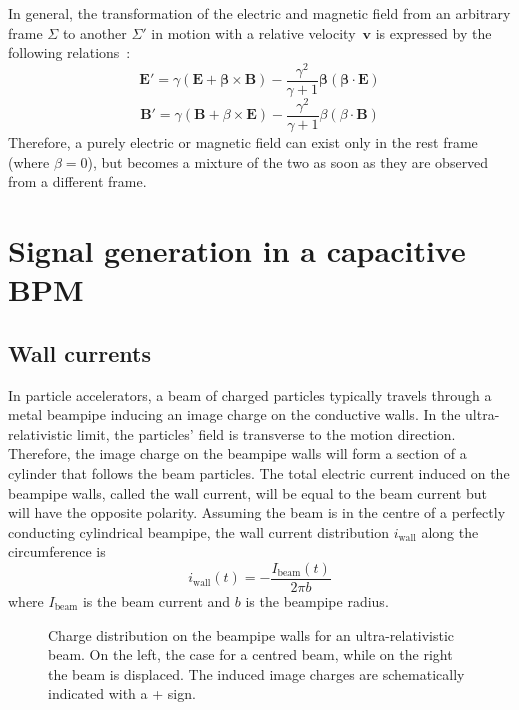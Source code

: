 In general, the transformation of the electric and magnetic field from an arbitrary frame $\Sigma$ to another $\Sigma'$ in motion with a relative velocity~$\mathbf{v}$ is expressed by the following relations~\cite{Jackson:490457}:
\begin{equation}
\mathbf{E'} = \gamma \left( \mathbf{E} + \mathbf{\beta} \times \mathbf{B} \right) -\frac{\gamma^2}{\gamma +1} \mathbf{\beta} \left( \mathbf{\beta} \cdot \mathbf{E}  \right)
\end{equation}
\begin{equation}
\mathbf{B'} = \gamma \left( \mathbf{B} + \beta \times \mathbf{E} \right) -\frac{\gamma^2}{\gamma +1} \beta \left( \beta \cdot \mathbf{B}  \right)
\end{equation}
Therefore, a purely electric or magnetic field can exist only in the rest frame (where $\beta=0$), but becomes a mixture of the two as soon as they are observed from a different frame. 






\section[Signal generation in a capacitive BPM]{Signal generation in a capacitive BPM}


\subsection[Wall currents]{Wall currents}

In particle accelerators, a beam of charged particles typically travels through a metal beampipe inducing an image charge on the conductive walls. In the ultra-relativistic limit, the particles' field is transverse to the motion direction. Therefore, the image charge on the beampipe walls will form a section of a cylinder that follows the beam particles. The total electric current induced on the beampipe walls, called the wall current, will be equal to the beam current but will have the opposite polarity. Assuming the beam is in the centre of a perfectly conducting cylindrical beampipe, the wall current distribution $i_\text{wall}$ along the circumference is
\begin{equation}
i_\text{wall}(t) = -\frac{I_\text{beam}(t)}{2\pi b}
\end{equation}
where $I_\text{beam}$ is the beam current and $b$ is the beampipe radius. 


\begin{figure}[!b]
\centering

\caption{Charge distribution on the beampipe walls for an ultra-relativistic beam. On the left, the case for a centred beam, while on the right the beam is displaced. The induced image charges are schematically indicated with a + sign.}
\label{fig:wall_current}
\end{figure}




